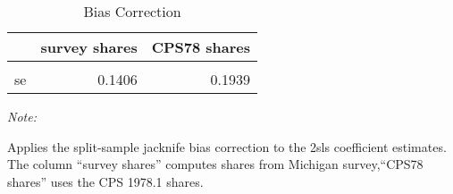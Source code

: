 \begin{table}

\caption{\label{tab:bias:out:2sls:stage2}Bias Correction}
\centering
\begin{threeparttable}
\begin{tabular}[t]{lrr}
\toprule
  & survey shares & CPS78 shares\\
\midrule
\cellcolor{gray!6}{coeff.} & \cellcolor{gray!6}{0.3695} & \cellcolor{gray!6}{0.6000}\\
se & 0.1406 & 0.1939\\
\bottomrule
\end{tabular}
\begin{tablenotes}
\item \textit{Note: } 
\item Applies the split-sample jacknife bias correction to the 2sls coefficient estimates. The column ``survey shares'' computes shares from Michigan survey,``CPS78 shares'' uses the CPS 1978.1 shares.
\end{tablenotes}
\end{threeparttable}
\end{table}
